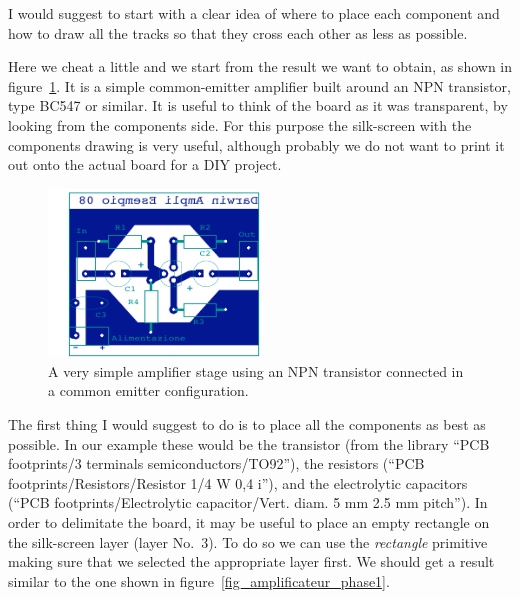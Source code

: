 \documentclass[10pt,a4paper,twoside]{scrreprt}
\begin{document}
I would suggest to start with a clear idea of where to place each
component and how to draw all the tracks so that they cross each
other as less as possible.

Here we cheat a little and we start from the result we want
to obtain, as shown in figure~\ref{fig_amplificateur}. It is a simple
common-emitter amplifier built around an NPN transistor, type BC547
or similar. It is useful to think of the board as it was transparent,
by looking from the components side. For this purpose the silk-screen
with the components drawing is very useful, although probably
we do not want to print it out onto the actual board for a DIY project.

%
\begin{figure}
\centering \includegraphics[width=0.5\textwidth]{amplificateur}

\caption{A very simple amplifier stage using an NPN transistor connected in
a common emitter configuration.}


\label{fig_amplificateur}
\end{figure}

The first thing I would suggest to do is to place all the components
as best as possible. In our example these would be the transistor
(from the library ``PCB footprints/3 terminals semiconductors/TO92''),
the resistors (``PCB footprints/Resistors/Resistor 1/4 W 0,4 i''),
and the electrolytic capacitors (``PCB footprints/Electrolytic capacitor/Vert. diam. 5 mm 2.5 mm pitch''). In order to delimitate
the board, it may be useful to place an empty rectangle on the silk-screen
layer (layer No.~3). To do so we can use the \emph{rectangle} primitive
making sure that we selected the appropriate layer first. We should
get a result similar to the one shown in figure~\ref{fig_amplificateur_phase1}.%
\end{document}
